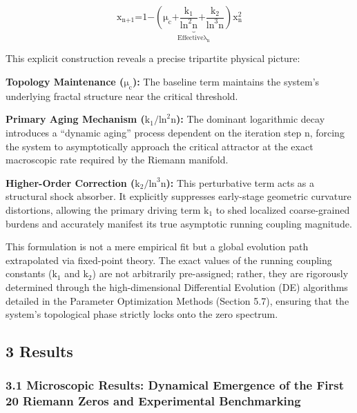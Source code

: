 \[\text{x}_{\text{n}\text{+1}}\text{=1−}\underset{\text{Effective}\text{λ}_{\text{n}}}{\underset{\text{⏟}}{\left( \text{μ}_{\text{c}}\text{+}\frac{\text{k}_{\text{1}}}{\text{ln}^{\text{2}}\text{n}}\text{+}\frac{\text{k}_{\text{2}}}{\text{ln}^{\text{3}}\text{n}} \right)}}\text{x}_{\text{n}}^{\text{2}}\]

This explicit construction reveals a precise tripartite physical
picture:

\textbf{Topology Maintenance (}\(\text{μ}_{\text{c}}\)\textbf{):} The
baseline term maintains the system's underlying fractal structure near
the critical threshold.

\textbf{Primary Aging Mechanism
(}\(\text{k}_{\text{1}}\text{/}\text{ln}^{\text{2}}\text{n}\)\textbf{):}
The dominant logarithmic decay introduces a ``dynamic aging'' process
dependent on the iteration step \(\text{n}\), forcing the system to
asymptotically approach the critical attractor at the exact macroscopic
rate required by the Riemann manifold.

\textbf{Higher-Order Correction
(}\(\text{k}_{\text{2}}\text{/}\text{ln}^{\text{3}}\text{n}\)\textbf{):}
This perturbative term acts as a structural shock absorber. It
explicitly suppresses early-stage geometric curvature distortions,
allowing the primary driving term \(\text{k}_{\text{1}}\) to shed
localized coarse-grained burdens and accurately manifest its true
asymptotic running coupling magnitude.

This formulation is not a mere empirical fit but a global evolution path
extrapolated via fixed-point theory. The exact values of the running
coupling constants (\(\text{k}_{\text{1}}\) and \(\text{k}_{\text{2}}\))
are not arbitrarily pre-assigned; rather, they are rigorously determined
through the high-dimensional Differential Evolution (DE) algorithms
detailed in the Parameter Optimization Methods (Section 5.7), ensuring
that the system's topological phase strictly locks onto the zero
spectrum.

\hypertarget{results}{%
\subsection{\texorpdfstring{\textbf{3
Results}}{3 Results}}\label{results}}

\hypertarget{microscopic-results-dynamical-emergence-of-the-first-20-riemann-zeros-and-experimental-benchmarking}{%
\subsubsection{\texorpdfstring{\textbf{3.1 Microscopic Results:
Dynamical Emergence of the First 20 Riemann Zeros and Experimental
Benchmarking}}{3.1 Microscopic Results: Dynamical Emergence of the First 20 Riemann Zeros and Experimental Benchmarking}}\label{microscopic-results-dynamical-emergence-of-the-first-20-riemann-zeros-and-experimental-benchmarking}}

